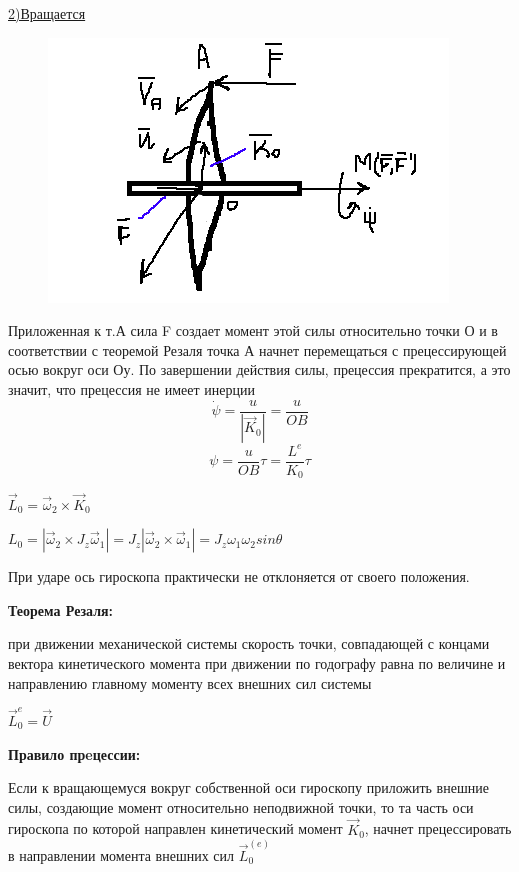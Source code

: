 {\begin{center}
    \par \underline{2)Вращается}
    \begin{figure}[H]
        \centering\includegraphics[scale=0.5]{img/2.jpeg} 
    \end{figure}
    \par Приложенная к т.А сила F создает момент этой силы относительно точки О и в соответствии с теоремой Резаля точка А начнет перемещаться с прецессирующей осью вокруг оси Оу. По завершении действия силы, прецессия прекратится, а это значит, что прецессия не имеет инерции
        $$\dot \psi = \frac{u}{|\vec K_0|} = \frac{u}{OB}$$
        $$\psi = \frac{u}{OB} \tau = \frac{L^e}{K_0} \tau$$
        
        \par $\vec{L}_0=\vec{\omega}_2\times \vec{K}_0$

        \par $L_0=\left| \vec{\omega}_2\times J_z\vec{\omega}_1\right|=J_z\left| \vec{\omega}_2\times \vec{\omega}_1  \right|=J_z\omega_{1} \omega_{2} sin\theta$
    \par При ударе ось гироскопа практически не отклоняется от своего положения.

    \par \textbf{Теорема Резаля:} 
    
    \par при движении механической системы скорость точки, совпадающей с концами вектора кинетического момента при движении по годографу равна по величине и направлению главному моменту всех внешних сил системы

    \par $\vec{L}_0^{e}=\vec{U}$

    \par \textbf{Правило прeцессии:}

    \par Если к вращающемуся вокруг собственной оси гироскопу приложить внешние силы, создающие момент относительно неподвижной точки, то та часть оси гироскопа по которой направлен кинетический момент $\vec{K}_0$, начнет прецессировать в направлении момента внешних сил $\vec{L}_0^{(e)}$ 
    

\end{center}}
